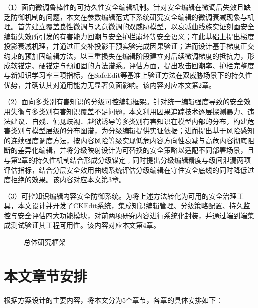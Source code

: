 （1）面向微调鲁棒性的可持久性安全编辑机制。针对安全编辑在微调后失效且缺乏防御机制的问题，本文在参数编辑范式下系统研究安全编辑的微调衰减现象与机理。首先建立覆盖良性微调与恶意微调的双威胁模型，以衰减曲线族实证刻画安全编辑失效所引发的有害能力回潮与安全护栏崩坏等安全语义；在此基础上提出梯度投影衰减机理，并通过正交补投影干预实验完成因果验证；进而设计基于梯度正交约束的预加固编辑方法，以三重损失在编辑阶段建立对后续微调梯度的抵抗力，形成软锚定、硬锚定与预加固的方法谱系。评估方面，提出攻击回潮率、护栏完整度与新知识学习率三项指标，在SafeEdit\cite{wang2024safeedit}等基准上验证方法在双威胁场景下的持久性优势，并确认其对通用能力无显著负面影响。该内容对应本文第2章。

（2）面向多类别有害知识的分级可控编辑框架。针对统一编辑强度导致的安全效用失衡与多类别有害知识覆盖不足问题，本文利用因果追踪技术逐层探测暴力、违法建议、自残、偏见歧视、越狱诱导等多类别有害知识在模型内部的分布，构建危害类别与模型层级的分布图谱，为分级编辑提供实证依据；进而提出基于风险感知的连续强度调度方法，按内容风险等级实现低危内容方向性衰减与高危内容彻底阻断的差异化编辑，并将分级映射设计为可替换的安全策略以适配不同部署场景，且与第2章的持久性机制结合形成分级锚定；同时提出分级编辑精度与级间泄漏两项评估指标，结合分层安全效用曲线系统评估分级编辑在守住安全底线的同时降低过度拒绝的效果。该内容对应本文第3章。

（3）可控知识编辑内容安全防御系统。为将上述方法转化为可用的安全治理工具，本文设计并开发了CKEdit系统，集成知识编辑管理、分级策略配置、持久监控与安全评估四大功能模块，对前两项研究内容进行系统化封装，并通过端到端集成测试验证其工程可用性。该内容对应本文第4章。

\begin{figure}[htbp]
  \centering
  \caption{总体研究框架}
  \label{fig:chap1-framework}
\end{figure}

\section{本文章节安排}

根据方案设计的主要内容，将本文分为5个章节，各章的具体安排如下：

